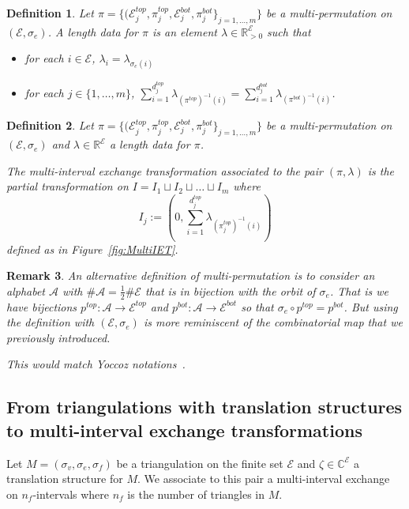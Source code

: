 \documentclass{article}
\def\RR{\mathbb{R}}
\def\CC{\mathbb{C}}
\def\cA{\mathcal{A}}
\def\cE{\mathcal{E}}
\newtheorem{definition}{Definition}
\newtheorem{remark}[definition]{Remark}
\begin{document}
\begin{definition}
Let $\pi = \{(\cE^{top}_j, \pi^{top}_j, \cE^{bot}_j, \pi^{bot}_j\}_{j=1,\ldots,m}\}$ be
a multi-permutation on $(\cE, \sigma_e)$. A \emph{length data} for $\pi$ is
an element $\lambda \in \RR_{> 0}^{\cE}$ such that
\begin{itemize}
\item for each $i \in \cE$, $\lambda_i = \lambda_{\sigma_e(i)}$
\item for each $j \in \{1,\ldots,m\}$, $\displaystyle \sum_{i = 1}^{d_j^{top}} \lambda_{(\pi^{top})^{-1}(i)} = \sum_{i = 1}^{d_j^{bot}} \lambda_{(\pi^{bot})^{-1}(i)}$.
\end{itemize}
\end{definition}


\begin{definition}
Let $\pi = \{(\cE^{top}_j, \pi^{top}_j, \cE^{bot}_j, \pi^{bot}_j\}_{j=1,\ldots,m}\}$
be a multi-permutation on $(\cE, \sigma_e)$ and $\lambda \in \RR^\cE$
a length data for $\pi$.

The \emph{multi-interval exchange transformation} associated to the pair $(\pi,\lambda)$
is the partial transformation on $I = I_1 \sqcup I_2 \sqcup \ldots \sqcup I_m$ where
\[
I_j := \left(0, \sum_{i=1}^{d_j^{top}} \lambda_{(\pi^{top}_j)^{-1}(i)} \right)
\]
defined as in Figure~\ref{fig:MultiIET}.
\end{definition}

\begin{remark}
An alternative definition of multi-permutation is to consider an alphabet $\cA$
with $\# \cA = \frac{1}{2} \# \cE$ that is in bijection with the orbit of
$\sigma_e$. That is we have bijections $p^{top}: \cA \to \cE^{top}$ and
$p^{bot}: \cA \to \cE^{bot}$ so that $\sigma_e \circ p^{top} = p^{bot}$.
But using the definition with $(\cE, \sigma_e)$ is more reminiscent of
the combinatorial map that we previously introduced.

This would match Yoccoz notations~\cite{Yoccoz}.
\end{remark}

\subsection{From triangulations with translation structures to multi-interval exchange transformations}
Let $M = (\sigma_v, \sigma_e, \sigma_f)$ be a triangulation on
the finite set $\cE$ and $\zeta \in \CC^\cE$ a translation structure for $M$.
We associate to this pair a multi-interval exchange on
$n_f$-intervals where $n_f$ is the number of triangles in $M$.
\end{document}
